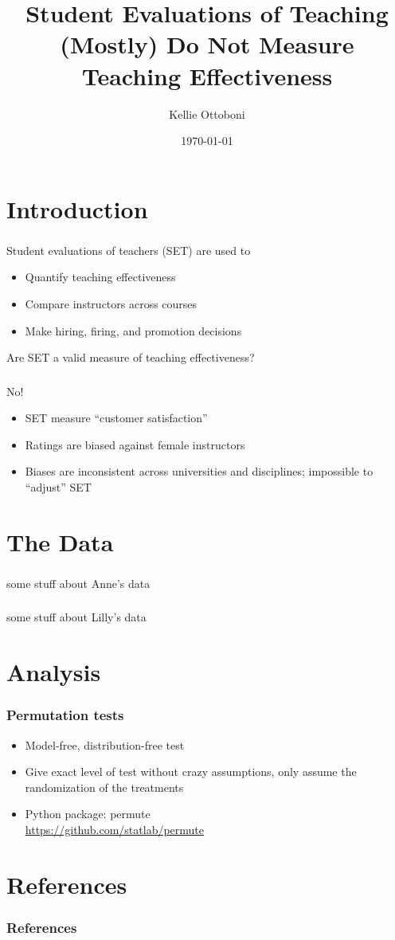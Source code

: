 \documentclass{beamer}
\title[SET]{Student Evaluations of Teaching (Mostly) Do Not Measure Teaching Effectiveness}
\author{Kellie Ottoboni}
\institute[]{Department of Statistics, UC Berkeley \\ Berkeley Institute for Data Science}
\date{\today}
\begin{document}
\frame{\titlepage}

\section{Introduction}
\frame
{
  \frametitle{}
 \begin{center}
 \Large{ Student evaluations of teachers (SET) are used to} \\
  \begin{itemize}
  \item Quantify teaching effectiveness
  \item Compare instructors across courses
  \item Make hiring, firing, and promotion decisions  
  \end{itemize}
  \vfill
Are SET a valid measure of teaching effectiveness?
\end{center}
}

\frame
{
  \frametitle{}
  \begin{center}
  \Huge{No!}
\vfill
\Large
  \begin{itemize}
  \item SET measure ``customer satisfaction''
  \item Ratings are biased against female instructors
  \item Biases are inconsistent across universities and disciplines; impossible to ``adjust'' SET
  \end{itemize}
  \end{center}
}

\section{The Data}
\frame
{
  \frametitle{\cite{Boring2015}}
 some stuff about Anne's data
}

\frame
{
  \frametitle{\cite{MacNell2014}}
some stuff about Lilly's data
}

\section{Analysis}
\frame
{
 \frametitle{Permutation tests}
 \begin{itemize}
 \item Model-free, distribution-free test
 \item Give exact level of test without crazy assumptions, only assume the randomization of the treatments
 \item{Python package: permute \\
 \url{https://github.com/statlab/permute}
 }
 \end{itemize}

}

\section{References}
\begin{frame}
\frametitle{References}


\itemize
\end{frame}
\end{document}
